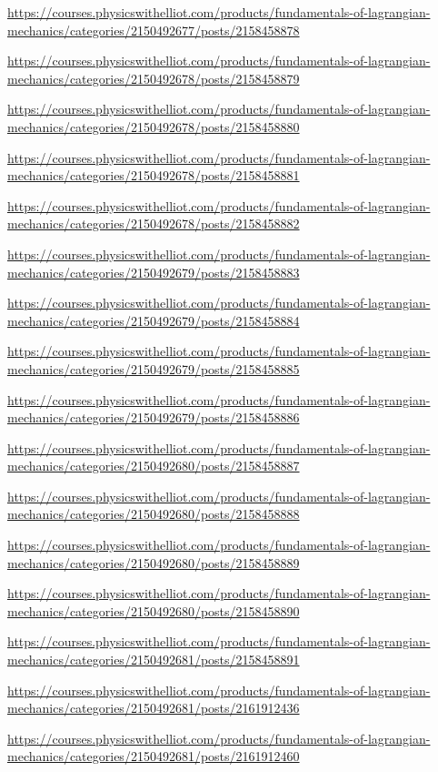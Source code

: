 \documentclass[
]{book}
\theoremstyle{definition}
\theoremstyle{definition}
\theoremstyle{definition}
\theoremstyle{definition}
\theoremstyle{remark}
\begin{document}
\url{https://courses.physicswithelliot.com/products/fundamentals-of-lagrangian-mechanics/categories/2150492677/posts/2158458878}

\url{https://courses.physicswithelliot.com/products/fundamentals-of-lagrangian-mechanics/categories/2150492678/posts/2158458879}

\url{https://courses.physicswithelliot.com/products/fundamentals-of-lagrangian-mechanics/categories/2150492678/posts/2158458880}

\url{https://courses.physicswithelliot.com/products/fundamentals-of-lagrangian-mechanics/categories/2150492678/posts/2158458881}

\url{https://courses.physicswithelliot.com/products/fundamentals-of-lagrangian-mechanics/categories/2150492678/posts/2158458882}

\url{https://courses.physicswithelliot.com/products/fundamentals-of-lagrangian-mechanics/categories/2150492679/posts/2158458883}

\url{https://courses.physicswithelliot.com/products/fundamentals-of-lagrangian-mechanics/categories/2150492679/posts/2158458884}

\url{https://courses.physicswithelliot.com/products/fundamentals-of-lagrangian-mechanics/categories/2150492679/posts/2158458885}

\url{https://courses.physicswithelliot.com/products/fundamentals-of-lagrangian-mechanics/categories/2150492679/posts/2158458886}

\url{https://courses.physicswithelliot.com/products/fundamentals-of-lagrangian-mechanics/categories/2150492680/posts/2158458887}

\url{https://courses.physicswithelliot.com/products/fundamentals-of-lagrangian-mechanics/categories/2150492680/posts/2158458888}

\url{https://courses.physicswithelliot.com/products/fundamentals-of-lagrangian-mechanics/categories/2150492680/posts/2158458889}

\url{https://courses.physicswithelliot.com/products/fundamentals-of-lagrangian-mechanics/categories/2150492680/posts/2158458890}

\url{https://courses.physicswithelliot.com/products/fundamentals-of-lagrangian-mechanics/categories/2150492681/posts/2158458891}

\url{https://courses.physicswithelliot.com/products/fundamentals-of-lagrangian-mechanics/categories/2150492681/posts/2161912436}

\url{https://courses.physicswithelliot.com/products/fundamentals-of-lagrangian-mechanics/categories/2150492681/posts/2161912460}
\end{document}
